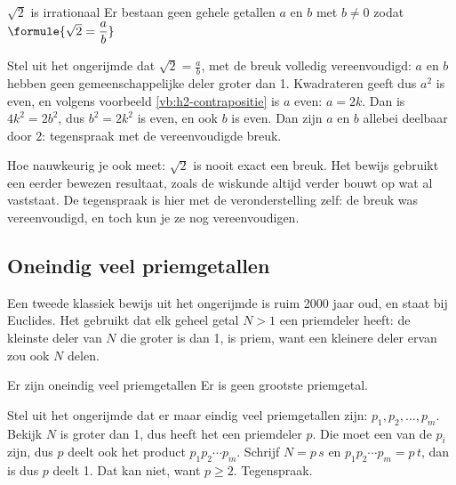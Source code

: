 \begin{theorie}
\begin{stelling}{$\sqrt2$ is irrationaal}
Er bestaan geen gehele getallen $a$ en $b$ met $b \neq 0$ zodat \quad $\formule{\sqrt2 = \dfrac{a}{b}}$
\end{stelling}

\begin{bewijs}
Stel uit het ongerijmde dat $\sqrt2 = \frac{a}{b}$, met de breuk volledig vereenvoudigd: $a$ en $b$ hebben geen gemeenschappelijke deler groter dan 1. Kwadrateren geeft
dus $a^2$ is even, en volgens voorbeeld \ref{vb:h2-contrapositie} is $a$ even: $a = 2k$. Dan is $4k^2 = 2b^2$, dus $b^2 = 2k^2$ is even, en ook $b$ is even. Dan zijn $a$ en $b$ allebei deelbaar door 2: tegenspraak met de vereenvoudigde breuk.
\end{bewijs}
\end{theorie}

Hoe nauwkeurig je ook meet: $\sqrt2$ is nooit exact een breuk. Het bewijs gebruikt een eerder bewezen resultaat, zoals de wiskunde altijd verder bouwt op wat al vaststaat. De tegenspraak is hier met de veronderstelling zelf: de breuk was vereenvoudigd, en toch kun je ze nog vereenvoudigen.

\begin{oefeningen}
\end{oefeningen}

\subsection{Oneindig veel priemgetallen}

Een tweede klassiek bewijs uit het ongerijmde is ruim 2000 jaar oud, en staat bij Euclides. Het gebruikt dat elk geheel getal $N > 1$ een priemdeler heeft: de kleinste deler van $N$ die groter is dan 1, is priem, want een kleinere deler ervan zou ook $N$ delen.

\begin{theorie}
\begin{stelling}{Er zijn oneindig veel priemgetallen}
Er is geen grootste priemgetal.
\end{stelling}

\begin{bewijs}
Stel uit het ongerijmde dat er maar eindig veel priemgetallen zijn: $p_1, p_2, \ldots, p_m$. Bekijk
$N$ is groter dan 1, dus heeft het een priemdeler $p$. Die moet een van de $p_i$ zijn, dus $p$ deelt ook het product $p_1 p_2 \cdots p_m$. Schrijf $N = p\,s$ en $p_1 p_2 \cdots p_m = p\,t$, dan is
dus $p$ deelt 1. Dat kan niet, want $p \geqslant 2$. Tegenspraak.
\end{bewijs}
\end{theorie}

